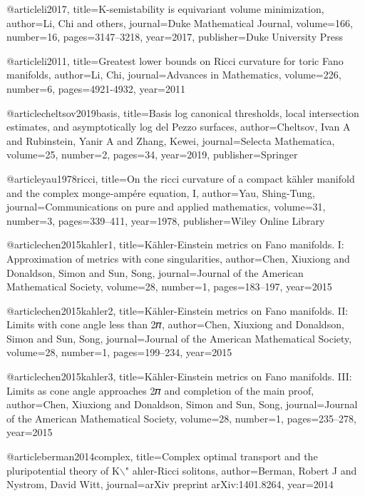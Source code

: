 @article{li2017,
  title={K-semistability is equivariant volume minimization},
  author={Li, Chi and others},
  journal={Duke Mathematical Journal},
  volume={166},
  number={16},
  pages={3147--3218},
  year={2017},
  publisher={Duke University Press}
}


@article{li2011,
  title={Greatest lower bounds on Ricci curvature for toric Fano manifolds},
  author={Li, Chi},
  journal={Advances in Mathematics},
  volume={226},
  number={6},
  pages={4921-4932},
  year={2011}
}

@article{cheltsov2019basis,
  title={Basis log canonical thresholds, local intersection estimates, and asymptotically log del Pezzo surfaces},
  author={Cheltsov, Ivan A and Rubinstein, Yanir A and Zhang, Kewei},
  journal={Selecta Mathematica},
  volume={25},
  number={2},
  pages={34},
  year={2019},
  publisher={Springer}
}

@article{yau1978ricci,
  title={On the ricci curvature of a compact k{\"a}hler manifold and the complex monge-amp{\'e}re equation, I},
  author={Yau, Shing-Tung},
  journal={Communications on pure and applied mathematics},
  volume={31},
  number={3},
  pages={339--411},
  year={1978},
  publisher={Wiley Online Library}
}

@article{chen2015kahler1,
  title={K{\"a}hler-Einstein metrics on Fano manifolds. I: Approximation of metrics with cone singularities},
  author={Chen, Xiuxiong and Donaldson, Simon and Sun, Song},
  journal={Journal of the American Mathematical Society},
  volume={28},
  number={1},
  pages={183--197},
  year={2015}
}

@article{chen2015kahler2,
  title={K{\"a}hler-Einstein metrics on Fano manifolds. II: Limits with cone angle less than 2𝜋},
  author={Chen, Xiuxiong and Donaldson, Simon and Sun, Song},
  journal={Journal of the American Mathematical Society},
  volume={28},
  number={1},
  pages={199--234},
  year={2015}
}

@article{chen2015kahler3,
  title={K{\"a}hler-Einstein metrics on Fano manifolds. III: Limits as cone angle approaches 2𝜋 and completion of the main proof},
  author={Chen, Xiuxiong and Donaldson, Simon and Sun, Song},
  journal={Journal of the American Mathematical Society},
  volume={28},
  number={1},
  pages={235--278},
  year={2015}
}

@article{berman2014complex,
  title={Complex optimal transport and the pluripotential theory of K$\backslash$" ahler-Ricci solitons},
  author={Berman, Robert J and Nystrom, David Witt},
  journal={arXiv preprint arXiv:1401.8264},
  year={2014}
}


